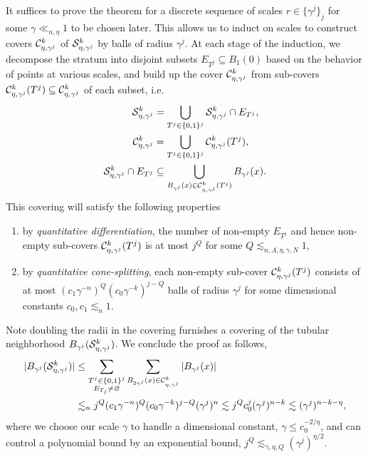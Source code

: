 It suffices to prove the theorem for a discrete sequence of scales $r \in \{\gamma^j\}_j$ for some $\gamma \ll_{n, \eta} 1$ to be chosen later. This allows us to induct on scales to construct covers $\mathcal C^k_{\eta, \gamma^j}$ of  $\mathcal S^k_{\eta, \gamma^j}$ by balls of radius $\gamma^j$. At each stage of the induction, we decompose the stratum into disjoint subsets $E_{T^j} \subseteq B_1 (0)$ based on the behavior of points at various scales, and build up the cover $\mathcal C^k_{\eta, \gamma^j}$ from sub-covers $\mathcal C^k_{\eta, \gamma^j} (T^j) \subseteq \mathcal C^k_{\eta, \gamma^j}$ of each subset, i.e.
	\begin{alignat*}{2}
		\mathcal S^k_{\eta, \gamma^j} 
			&= \bigcup_{T^j \in \{0, 1\}^j} \mathcal S^k_{\eta, \gamma^j} \cap E_{T^j},
			\\
		\mathcal C^k_{\eta, \gamma^j}
			&= \bigcup	_{T^j \in \{0, 1\}^j} \mathcal C^k_{\eta, \gamma^j} (T^j),	 \\
		 \mathcal S^k_{\eta, \gamma^j} \cap E_{T^j} 
		 	&\subseteq \bigcup_{B_{\gamma^j} (x) \in \mathcal C^k_{\eta, \gamma^j} (T^j)} B_{\gamma^j} (x).
	\end{alignat*}	
This covering will satisfy the following properties
	\begin{enumerate}
		\item by \textit{quantitative differentiation}, the number of non-empty $E_{T^j}$ and hence non-empty sub-covers $\mathcal C^k_{\eta, \gamma^j} (T^j)$ is at most $j^Q$ for some $Q \lesssim_{n, \Lambda, \eta, \gamma, N} 1$, \label{prop:a}
		\item by \textit{quantitative cone-splitting}, each non-empty sub-cover $\mathcal C^k_{\eta, \gamma^j} (T^j)$ consists of at most $(c_1 \gamma^{-n})^{Q} (c_0 \gamma^{-k})^{j - Q}$ balls of radius $\gamma^j$ for some dimensional constants $c_0, c_1 \lesssim_n 1$. \label{prop:b}
	\end{enumerate}
Note doubling the radii in the covering furnishes a covering of the tubular neighborhood $B_{\gamma^j} (\mathcal S^k_{\eta, \gamma^j})$. We conclude the proof as follows, 
	\begin{align*}
		|B_{\gamma^j}(\mathcal S^k_{\eta, \gamma^j})| 
			&\leq \sum_{\substack{T^j \in \{0, 1\}^j\\ E_{T_j} \neq \varnothing}} \sum_{B_{2\gamma^j} (x) \in \mathcal C^k_{\eta, \gamma^j}} |B_{\gamma^j} (x)| \\
			&\lesssim_n j^Q (c_1 \gamma^{-n})^{Q} (c_0 \gamma^{-k})^{j - Q} (\gamma^j)^n \lesssim j^Q c_0^j (\gamma^j)^{n - k} \lesssim (\gamma^j)^{n - k - \eta},
	\end{align*}
where we choose our scale $\gamma$ to handle a dimensional constant, $\gamma \leq c_0^{-2/\eta}$, and can control a polynomial bound by an exponential bound, $j^Q \lesssim_{\gamma, \eta, Q} (\gamma^j)^{\eta/2}$. 

